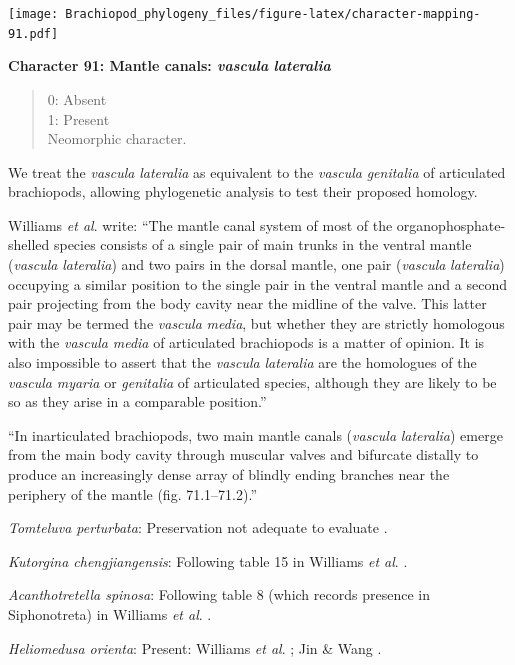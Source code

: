 \documentclass[]{book}
\theoremstyle{definition}
\theoremstyle{definition}
\theoremstyle{definition}
\theoremstyle{remark}
\begin{document}
\texttt{[image: Brachiopod\_phylogeny\_files/figure-latex/character-mapping-91.pdf]}

\textbf{Character 91: Mantle canals: \emph{vascula} \emph{lateralia}}

\begin{quote}
0: Absent\\
1: Present\\
Neomorphic character.
\end{quote}

We treat the \emph{vascula} \emph{lateralia} as equivalent to the
\emph{vascula} \emph{genitalia} of articulated brachiopods, allowing
phylogenetic analysis to test their proposed homology.

Williams \emph{et al}. \citeyearpar{Williams1997BrachiopodaRevised}
write: ``The mantle canal system of most of the organophosphate-shelled
species consists of a single pair of main trunks in the ventral mantle
(\emph{vascula} \emph{lateralia}) and two pairs in the dorsal mantle,
one pair (\emph{vascula} \emph{lateralia}) occupying a similar position
to the single pair in the ventral mantle and a second pair projecting
from the body cavity near the midline of the valve. This latter pair may
be termed the \emph{vascula} \emph{media}, but whether they are strictly
homologous with the \emph{vascula} \emph{media} of articulated
brachiopods is a matter of opinion. It is also impossible to assert that
the \emph{vascula} \emph{lateralia} are the homologues of the
\emph{vascula} \emph{myaria} or \emph{genitalia} of articulated species,
although they are likely to be so as they arise in a comparable
position.''

``In inarticulated brachiopods, two main mantle canals (\emph{vascula}
\emph{lateralia}) emerge from the main body cavity through muscular
valves and bifurcate distally to produce an increasingly dense array of
blindly ending branches near the periphery of the mantle (fig.
71.1--71.2).''

\emph{Tomteluva perturbata}: Preservation not adequate to evaluate
\citep{Streng2016Anew}.

\emph{Kutorgina chengjiangensis}: Following table 15 in Williams
\emph{et al}. \citeyearpar{Williams2000BrachiopodaLinguliformea}.

\emph{Acanthotretella spinosa}: Following table 8 (which records
presence in Siphonotreta) in Williams \emph{et al}.
\citeyearpar{Williams2000BrachiopodaLinguliformea}.

\emph{Heliomedusa orienta}: Present: Williams \emph{et al}.
\citeyearpar{Williams2000BrachiopodaLinguliformea}; Jin \& Wang
\citeyearpar{Jin1992Revisionof}.
\end{document}
